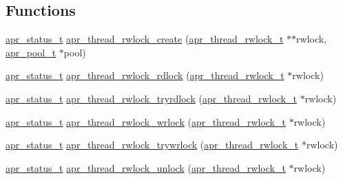 \subsection*{Functions}
\begin{DoxyCompactItemize}
\item 
\hyperlink{group__apr__errno_gaf76ee4543247e9fb3f3546203e590a6c}{apr\+\_\+status\+\_\+t} \hyperlink{group__apr__thread__rwlock_gadae9c87ad957112406b48947cb1f0e93}{apr\+\_\+thread\+\_\+rwlock\+\_\+create} (\hyperlink{group__apr__thread__rwlock_gaede9b908e3d9e6a8aed7bd10d0ae0498}{apr\+\_\+thread\+\_\+rwlock\+\_\+t} $\ast$$\ast$rwlock, \hyperlink{group__apr__pools_gaf137f28edcf9a086cd6bc36c20d7cdfb}{apr\+\_\+pool\+\_\+t} $\ast$pool)
\item 
\hyperlink{group__apr__errno_gaf76ee4543247e9fb3f3546203e590a6c}{apr\+\_\+status\+\_\+t} \hyperlink{group__apr__thread__rwlock_gad44a106cd9a81eef362d31837ca7018f}{apr\+\_\+thread\+\_\+rwlock\+\_\+rdlock} (\hyperlink{group__apr__thread__rwlock_gaede9b908e3d9e6a8aed7bd10d0ae0498}{apr\+\_\+thread\+\_\+rwlock\+\_\+t} $\ast$rwlock)
\item 
\hyperlink{group__apr__errno_gaf76ee4543247e9fb3f3546203e590a6c}{apr\+\_\+status\+\_\+t} \hyperlink{group__apr__thread__rwlock_ga2bbbc137f5c610e31bf87fd0a60c428e}{apr\+\_\+thread\+\_\+rwlock\+\_\+tryrdlock} (\hyperlink{group__apr__thread__rwlock_gaede9b908e3d9e6a8aed7bd10d0ae0498}{apr\+\_\+thread\+\_\+rwlock\+\_\+t} $\ast$rwlock)
\item 
\hyperlink{group__apr__errno_gaf76ee4543247e9fb3f3546203e590a6c}{apr\+\_\+status\+\_\+t} \hyperlink{group__apr__thread__rwlock_ga91543c9f97a6a1265524a5a8f55fef31}{apr\+\_\+thread\+\_\+rwlock\+\_\+wrlock} (\hyperlink{group__apr__thread__rwlock_gaede9b908e3d9e6a8aed7bd10d0ae0498}{apr\+\_\+thread\+\_\+rwlock\+\_\+t} $\ast$rwlock)
\item 
\hyperlink{group__apr__errno_gaf76ee4543247e9fb3f3546203e590a6c}{apr\+\_\+status\+\_\+t} \hyperlink{group__apr__thread__rwlock_ga54c04596f8a1f44630bdda5a25578d63}{apr\+\_\+thread\+\_\+rwlock\+\_\+trywrlock} (\hyperlink{group__apr__thread__rwlock_gaede9b908e3d9e6a8aed7bd10d0ae0498}{apr\+\_\+thread\+\_\+rwlock\+\_\+t} $\ast$rwlock)
\item 
\hyperlink{group__apr__errno_gaf76ee4543247e9fb3f3546203e590a6c}{apr\+\_\+status\+\_\+t} \hyperlink{group__apr__thread__rwlock_gac7b31112d972abfcac30252e622eb040}{apr\+\_\+thread\+\_\+rwlock\+\_\+unlock} (\hyperlink{group__apr__thread__rwlock_gaede9b908e3d9e6a8aed7bd10d0ae0498}{apr\+\_\+thread\+\_\+rwlock\+\_\+t} $\ast$rwlock)
$$
\end{DoxyCompactItemize}
